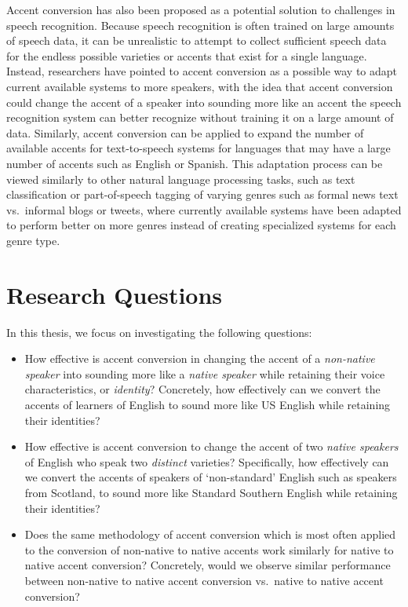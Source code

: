 \documentclass
[
    a4paper,
    twoside,
    12pt,
]
{report}
\begin{document}
Accent conversion has also been proposed as a potential solution to
challenges in speech recognition. Because speech recognition is often
trained on large amounts of speech data, it can be unrealistic to
attempt to collect sufficient speech data for the endless possible
varieties or accents that exist for a single language. Instead,
researchers have pointed to accent conversion as a possible way to adapt
current available systems to more speakers, with the idea that accent
conversion could change the accent of a speaker into sounding more like
an accent the speech recognition system can better recognize without
training it on a large amount of data. Similarly, accent conversion can
be applied to expand the number of available accents for text-to-speech
systems for languages that may have a large number of accents such as
English or Spanish. This adaptation process can be viewed similarly to
other natural language processing tasks, such as text classification or
part-of-speech tagging of varying genres such as formal news text
vs.~informal blogs or tweets, where currently available systems have
been adapted to perform better on more genres instead of creating
specialized systems for each genre type.

\hypertarget{research-questions}{%
\section{Research Questions}\label{research-questions}}

In this thesis, we focus on investigating the following questions:

\begin{itemize}
\item
  How effective is accent conversion in changing the accent of a
  \emph{non-native speaker} into sounding more like a \emph{native
  speaker} while retaining their voice characteristics, or
  \emph{identity}? Concretely, how effectively can we convert the
  accents of learners of English to sound more like US English while
  retaining their identities?
\item
  How effective is accent conversion to change the accent of two
  \emph{native speakers} of English who speak two \emph{distinct}
  varieties? Specifically, how effectively can we convert the accents of
  speakers of `non-standard' English such as speakers from Scotland, to
  sound more like Standard Southern English while retaining their
  identities?
\item
  Does the same methodology of accent conversion which is most often
  applied to the conversion of non-native to native accents work
  similarly for native to native accent conversion? Concretely, would we
  observe similar performance between non-native to native accent
  conversion vs.~native to native accent conversion?
\end{itemize}
\end{document}
